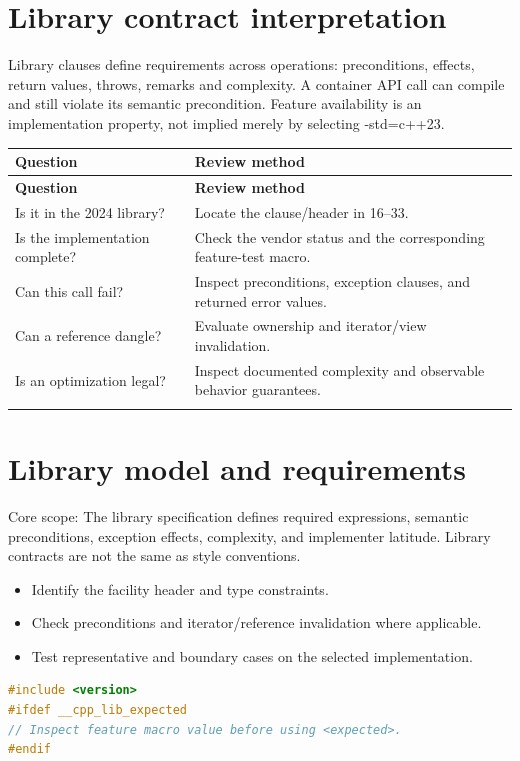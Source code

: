 \documentclass[11pt]{article}
\begin{document}
\docfront
\section{Library contract interpretation}
Library clauses define requirements across operations: preconditions, effects, return values, throws, remarks and complexity. A container API call can compile and still violate its semantic precondition. Feature availability is an implementation property, not implied merely by selecting -std=c++23.

\small
\begin{longtable}{@{}p{.25\linewidth}p{.69\linewidth}@{}}
\toprule
\textbf{Question} & \textbf{Review method}\\
\midrule
\endfirsthead
\toprule
\textbf{Question} & \textbf{Review method}\\
\midrule
\endhead
Is it in the 2024 library? & Locate the clause/header in 16--33.\\
\addlinespace[2pt]
Is the implementation complete? & Check the vendor status and the corresponding feature-test macro.\\
\addlinespace[2pt]
Can this call fail? & Inspect preconditions, exception clauses, and returned error values.\\
\addlinespace[2pt]
Can a reference dangle? & Evaluate ownership and iterator/view invalidation.\\
\addlinespace[2pt]
Is an optimization legal? & Inspect documented complexity and observable behavior guarantees.\\
\addlinespace[2pt]
\bottomrule
\end{longtable}
\normalsize
\section{Library model and requirements}
Core scope: The library specification defines required expressions, semantic preconditions, exception effects, complexity, and implementer latitude. Library contracts are not the same as style conventions.

\begin{itemize}[leftmargin=*,itemsep=1pt,topsep=3pt]
\item Identify the facility header and type constraints.
\item Check preconditions and iterator/reference invalidation where applicable.
\item Test representative and boundary cases on the selected implementation.
\end{itemize}
\begin{lstlisting}[language=C++]
#include <version>
#ifdef __cpp_lib_expected
// Inspect feature macro value before using <expected>.
#endif
\end{lstlisting}
\end{document}

